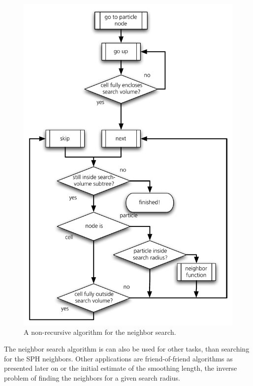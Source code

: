 \begin{figure}[htbp]
\begin{center}
\includegraphics[scale=0.6]{16algo_neighsearch.pdf}
\caption{A non-recursive algorithm for the neighbor search.}
\label{ch02_fig16}
\end{center}
\end{figure}

The neighbor search algorithm is can also be used for other tasks, than searching for the SPH neighbors. Other applications are friend-of-friend algorithms as presented later on or the initial estimate of the smoothing length, the inverse problem of finding the neighbors for a given search radius.

